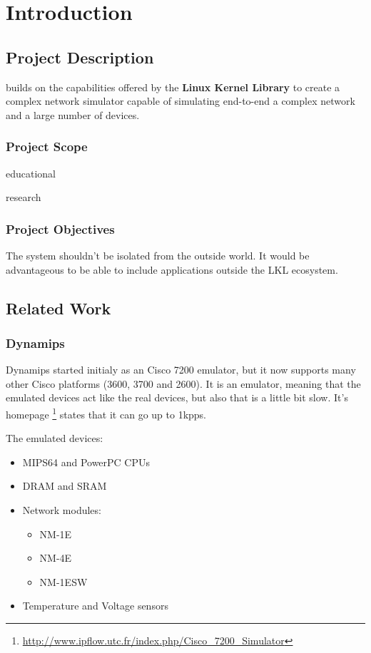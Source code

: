 \chapter{Introduction}
\label{chapter:intro}

\section{Project Description}
\label{sec:proj}

\textbf{\project} builds on the capabilities offered by the \textbf{Linux Kernel Library} to create
a complex network simulator capable of simulating end-to-end a complex network and a large number
of devices.

\subsection{Project Scope}
\label{sub-sec:proj-scope}

educational

research

\subsection{Project Objectives}
\label{sub-sec:proj-objectives}



The system shouldn't be isolated from the outside world. It would be advantageous to be able
to include applications outside the LKL ecosystem.

\section{Related Work}
\label{sec:proj-related}

\subsection{Dynamips}

Dynamips started initialy as an Cisco 7200 emulator, but it now supports many other
Cisco platforms (3600, 3700 and 2600). It is an emulator, meaning that the emulated
devices act like the real devices, but also that is a little bit slow. It's
homepage \footnote{\url{http://www.ipflow.utc.fr/index.php/Cisco_7200_Simulator}}
states that it can go up to 1kpps. 

The emulated devices:
\begin{itemize}
  \item MIPS64 and PowerPC CPUs
  \item DRAM and SRAM
  \item Network modules:
    \begin{itemize}
      \item NM-1E
      \item NM-4E
      \item NM-1ESW
    \end{itemize}
  \item Temperature and Voltage sensors
\end{itemize}

